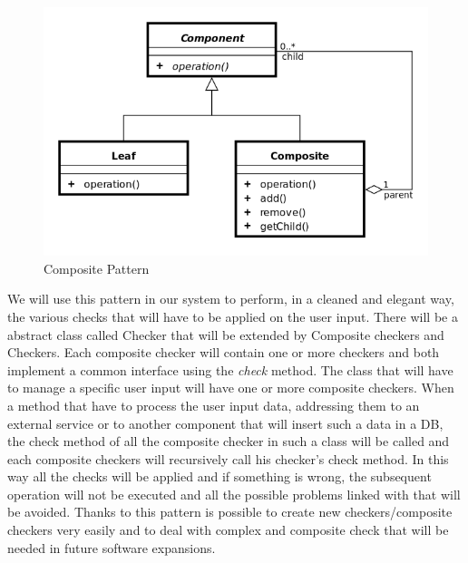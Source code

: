 \begin{figure}[H]
	\centering
	\includegraphics[scale=0.35]{Images/Patterns/Composite_Pattern}
	\caption{Composite Pattern}
\end{figure}
We will use this pattern in our system to perform, in a cleaned and elegant way, the various checks that will have to be applied on the user input. There will be a abstract class called Checker that will be extended by Composite checkers and Checkers. Each composite checker will contain one or more checkers and both implement a common interface using the \emph{check} method. The class that will have to manage a specific user input will have one or more composite checkers.
When a method that have to process the user input data, addressing them to an external service or to another component that will insert such a data in a DB, the check method of all the composite checker in such a class will be called and each composite checkers will recursively call his checker’s check method. In this way all the checks will be applied and if something is wrong, the subsequent operation will not be executed and all the possible problems linked with that will be avoided. 
Thanks to this pattern is possible to create new checkers/composite checkers very easily and to deal with complex and composite check that will be needed in future software expansions.


